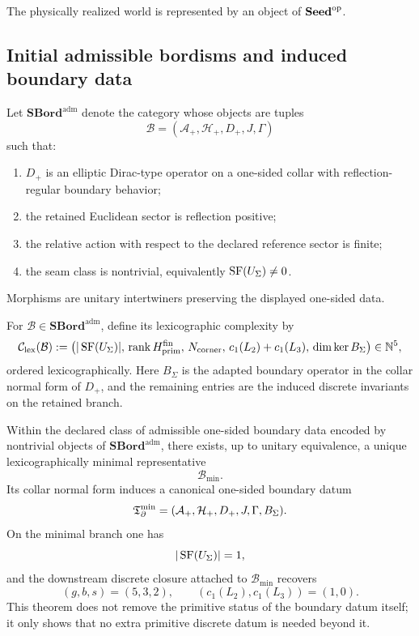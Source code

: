 \begin{axiom}
\label{ax:physical-operationality}
The physically realized world is represented by an object of $\mathbf{Seed}^{\mathrm{op}}$.
\end{axiom}

\subsection{Initial admissible bordisms and induced boundary data}

\begin{definition}
\label{def:admissible-spectral-bordism-category}
Let $\mathbf{SBord}^{\mathrm{adm}}$ denote the category whose objects are tuples
\[
\mathcal B=(\mathcal A_+,\mathcal H_+,D_+,J,\Gamma)
\]
such that:
\begin{enumerate}[label=(\roman*), leftmargin=1.5em, topsep=3pt, itemsep=2pt]
    \item $D_+$ is an elliptic Dirac-type operator on a one-sided collar with reflection-regular
    boundary behavior;
    \item the retained Euclidean sector is reflection positive;
    \item the relative action with respect to the declared reference sector is finite;
    \item the seam class is nontrivial, equivalently $\operatorname{SF}(U_\Sigma)\neq 0$.
\end{enumerate}
Morphisms are unitary intertwiners preserving the displayed one-sided data.
\end{definition}

\begin{definition}
\label{def:lexicographic-admissible-complexity}
For $\mathcal B\in\mathbf{SBord}^{\mathrm{adm}}$, define its lexicographic complexity by
\[
\mathcal C_{\mathrm{lex}}(\mathcal B)
:=
\bigl(
|\operatorname{SF}(U_\Sigma)|,\,
\operatorname{rank} H_{\mathrm{prim}}^{\mathrm{fin}},\,
N_{\mathrm{corner}},\,
c_1(L_2)+c_1(L_3),\,
\dim\ker B_\Sigma
\bigr)\in\mathbb N^5,
\]
ordered lexicographically. Here $B_\Sigma$ is the adapted boundary operator in the collar normal
form of $D_+$, and the remaining entries are the induced discrete invariants on the retained branch.
\end{definition}

\begin{theorem}
\label{thm:initial-admissible-bordism}
Within the declared class of admissible one-sided boundary data encoded by nontrivial objects of
$\mathbf{SBord}^{\mathrm{adm}}$, there exists, up to unitary equivalence, a unique lexicographically
minimal representative
\[
\mathcal B_{\min}.
\]
Its collar normal form induces a canonical one-sided boundary datum
\[
\mathfrak T_{\partial}^{\min}=(\mathcal A_+,\mathcal H_+,D_+,J,\Gamma,B_\Sigma).
\]
On the minimal branch one has
\[
|\operatorname{SF}(U_\Sigma)|=1,
\]
and the downstream discrete closure attached to $\mathcal B_{\min}$ recovers
\[
(g,b,s)=(5,3,2),
\qquad
(c_1(L_2),c_1(L_3))=(1,0).
\]
This theorem does not remove the primitive status of the boundary datum itself; it only shows that
no extra primitive discrete datum is needed beyond it.
\end{theorem}

